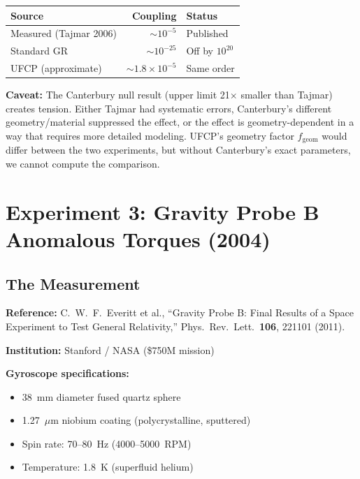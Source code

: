 \documentclass[11pt, a4paper]{article}
\begin{document}
\begin{center}
\begin{tabular}{@{}lrl@{}}
\toprule
\textbf{Source} & \textbf{Coupling} & \textbf{Status} \\
\midrule
Measured (Tajmar 2006) & $\sim 10^{-5}$ & Published \\
Standard GR & $\sim 10^{-25}$ & Off by $10^{20}$ \\
UFCP (approximate) & $\sim 1.8 \times 10^{-5}$ & Same order \\
\bottomrule
\end{tabular}
\end{center}

\begin{center}
\end{center}

\textbf{Caveat:} The Canterbury null result (upper limit 21$\times$
smaller than Tajmar) creates tension. Either Tajmar had systematic
errors, Canterbury's different geometry/material suppressed the
effect, or the effect is geometry-dependent in a way that requires
more detailed modeling. UFCP's geometry factor $f_{\text{geom}}$
would differ between the two experiments, but without Canterbury's
exact parameters, we cannot compute the comparison.

\section{Experiment 3: Gravity Probe B Anomalous Torques (2004)}

\subsection{The Measurement}

\textbf{Reference:} C.~W.~F.~Everitt et al., ``Gravity Probe B:
Final Results of a Space Experiment to Test General Relativity,''
Phys.\ Rev.\ Lett.\ \textbf{106}, 221101 (2011).

\textbf{Institution:} Stanford / NASA (\$750M mission)

\textbf{Gyroscope specifications:}
\begin{itemize}[nosep]
  \item 38~mm diameter fused quartz sphere
  \item 1.27~$\mu$m niobium coating (polycrystalline, sputtered)
  \item Spin rate: 70--80~Hz (4000--5000~RPM)
  \item Temperature: 1.8~K (superfluid helium)
\end{itemize}
\end{document}
